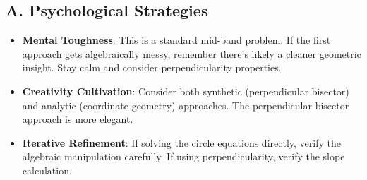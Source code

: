 \documentclass[12pt]{article}
\begin{document}
\begin{strategicbox}
\subsection*{A. Psychological Strategies}
\begin{itemize}[leftmargin=*]
    \item \textbf{Mental Toughness}: This is a standard mid-band problem. If the first approach gets algebraically messy, remember there's likely a cleaner geometric insight. Stay calm and consider perpendicularity properties.
    \item \textbf{Creativity Cultivation}: Consider both synthetic (perpendicular bisector) and analytic (coordinate geometry) approaches. The perpendicular bisector approach is more elegant.
    \item \textbf{Iterative Refinement}: If solving the circle equations directly, verify the algebraic manipulation carefully. If using perpendicularity, verify the slope calculation.
\end{itemize}


\end{strategicbox}
\end{document}
